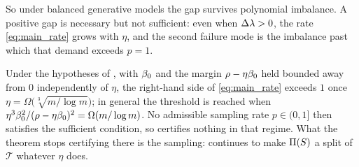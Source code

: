 So under balanced generative models the gap survives polynomial imbalance. A
positive gap is necessary but not sufficient: even when $\Delta\lambda>0$, the rate
\eqref{eq:main_rate} grows with $\eta$, and the second failure mode is the imbalance
past which that demand exceeds $p=1$.

\begin{corollary}\label{cor:infeasible}
Under the hypotheses of , with $\beta_0$ and the margin
$\rho-\eta\beta_0$ held bounded away from $0$ independently of $\eta$, the
right-hand side of \eqref{eq:main_rate} exceeds $1$ once
$\eta=\Omega\!\bigl(\sqrt[3]{m/\log m}\bigr)$; in general the threshold is
reached when $\eta^3\beta_0^2/(\rho-\eta\beta_0)^2=\Omega(m/\log m)$. No admissible sampling rate
$p\in(0,1]$ then satisfies the sufficient condition, so 
certifies nothing in that regime. What the theorem stops certifying there is the
sampling:  continues to make $\Pi(S)$ a split of
$\mathcal{T}$ whatever $\eta$ does.
\end{corollary}
